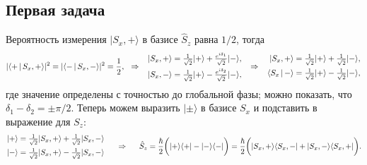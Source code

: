 \subsection*{Первая задача}

Вероятность измерения $| S_x, +\rangle $ в базисе $\hat{S}_z$ равна $1/2$, тогда
\begin{equation*}
    |\langle + \,|\, S_x,+ \rangle |^2 = 
    | \langle - \,|\, S_x, - \rangle|^2 = \frac{1}{2},
    \hspace{0.25cm} \Rightarrow \hspace{0.25cm}
    \left.\begin{aligned}
        | S_x, +\rangle = \textstyle \frac{1}{\sqrt{2}} | +\rangle + \textstyle\frac{e^{i \delta_1}}{\sqrt{2}} | -\rangle, \\
        | S_x, -\rangle = \textstyle\frac{1}{\sqrt{2}} | +\rangle - \textstyle\frac{e^{i \delta_2}}{\sqrt{2}} | -\rangle,
    \end{aligned}\right.
    \hspace{0.25cm} \Rightarrow \hspace{0.25cm}
    \left.\begin{aligned}
         | S_x,+\rangle &= \textstyle \frac{1}{\sqrt{2}} | +\rangle + \frac{1}{\sqrt{2}} | -\rangle , \\ 
        \langle S_x \,|\, - \rangle &= \textstyle\frac{1}{\sqrt{2}} | +\rangle - \textstyle\frac{1}{\sqrt{2}} | -\rangle,
    \end{aligned}\right.
\end{equation*}
где значение определены с точностью до глобальной фазы; можно показать, что $\delta_1 -\delta_2 = \pm \pi/2$. Теперь можем выразить $| \pm\rangle $ в базисе $S_x$ и подставить в выражение для $S_z$:
\begin{equation*}
    \left.\begin{aligned}
        | +\rangle &= \textstyle \frac{1}{\sqrt{2}} | S_x,+\rangle + \textstyle \frac{1}{\sqrt{2}} | S_x,-\rangle \\
        | -\rangle &= \textstyle\frac{1}{\sqrt{2}} | S_x,+\rangle - \textstyle\frac{1}{\sqrt{2}} | S_x,-\rangle 
    \end{aligned}\right.
    \hspace{0.5cm} \Rightarrow \hspace{0.5cm}   
    \hat{S}_z = \frac{\hbar}{2}\bigg(
        | + \rangle \langle + | - | - \rangle \langle - | 
    \bigg) = \frac{\hbar}{2} \bigg(
        | S_x, + \rangle \langle S_x, - | + | S_x, - \rangle \langle S_x, + | 
    \bigg).
\end{equation*}

